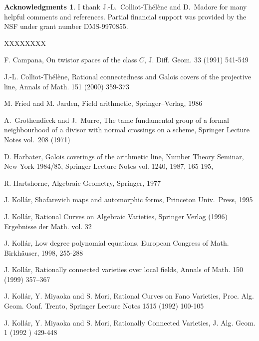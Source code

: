 \documentclass[12pt,twoside]{amsart}
\theoremstyle{definition}
\newtheorem{ack}{Acknowledgments}       \renewcommand{\theack}{}
\theoremstyle{remark}
\begin{document}
\begin{ack}  I   thank J.-L.\ Colliot-Th\'el\`ene and D.\ Madore
for many helpful
comments and references.
Partial financial support was provided by  the NSF under grant number 
DMS-9970855. 
\end{ack}



\begin{thebibliography}{XXXXXXXX}


 	F. Campana,
On twistor spaces of the
class $C$,  J. Diff. Geom.     33 (1991) 541-549


   J.-L. Colliot-Th\'el\`ene,
Rational connectedness and Galois covers of the projective
line,  Annals of Math. 151 (2000) 359-373


 M. Fried and M. Jarden,  Field
arithmetic, Springer--Verlag, 1986


A.\ Grothendieck and J.\  Murre,
The tame fundamental group of a formal neighbourhood of 
a divisor with normal crossings on a scheme,
Springer Lecture Notes  vol.\ 208 (1971)

  D. Harbater, Galois
 coverings of the arithmetic line, 
 Number Theory Seminar, New York 1984/85,  Springer Lecture Notes vol.   1240,
 1987,  165-195,
 

   R.   Hartshorne,
Algebraic Geometry,  Springer, 1977

   J. Koll\'ar, Shafarevich maps and
automorphic forms, Princeton Univ.\ Press, 1995

   J.   Koll\'ar,  
  Rational Curves on Algebraic Varieties, Springer Verlag (1996)
Ergebnisse der Math. vol. 32

  J.   Koll\'ar, Low degree polynomial
equations, European Congress of Math.  Birkh\"auser, 1998,
255-288

 J.   Koll\'ar, 
Rationally connected varieties over local fields,
Annals of  Math. 150 (1999) 357--367

 J. Koll\'ar, Y. Miyaoka  and S. Mori, 
Rational Curves on Fano Varieties, Proc. Alg. Geom. Conf.  Trento, 
Springer Lecture Notes 1515 (1992) 100-105

 J. Koll\'ar, Y. Miyaoka  and S. Mori, 
Rationally Connected Varieties, J. Alg. Geom. 1 (1992 )
429-448



\end{thebibliography}
\end{document}
